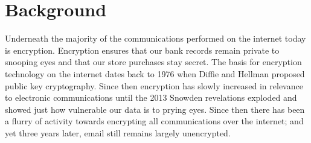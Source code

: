 \documentclass[10pt,twocolumn]{article}
\begin{document}
\section{Background}
\par Underneath the majority of the communications performed on the internet today is encryption. Encryption ensures that our bank records remain private to snooping eyes and that our store purchases stay secret. The basis for encryption technology on the internet dates back to 1976 when Diffie and Hellman proposed public key cryptography. Since then encryption has slowly increased in relevance to electronic communications until the 2013 Snowden revelations exploded and showed just how vulnerable our data is to prying eyes. Since then there has been a flurry of activity towards encrypting all communications over the internet; and yet three years later, email still remains largely unencrypted.
\end{document}
